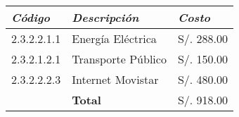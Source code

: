             \begin{table}[h!]
                \centering
                \begin{tabular}{|p{2cm}|p{4cm}|p{2.2cm}|} \hline
                    
                
                \textit{{\bf{Código}}} &
                \textit{{\bf{Descripción}}} &
                \textit{{\bf{Costo}}}
                \\ \hline

                2.3.2.2.1.1 &
                Energía Eléctrica &
                S/. 288.00
                \\ \hline

                2.3.2.1.2.1 &
                Transporte Público &
                S/. 150.00
                \\ \hline

                2.3.2.2.2.3 &
                Internet Movistar &
                S/. 480.00
                \\ \hline

                &
                \bf{Total} &
                S/. 918.00
                \\ \hline

                \end{tabular}
            \end{table}
